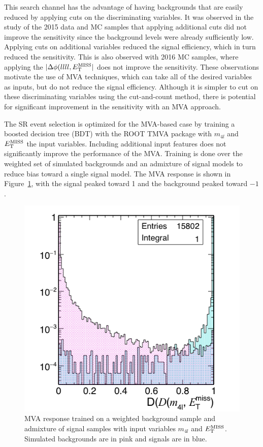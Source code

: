 This search channel has the advantage of having backgrounds that are easily reduced by applying cuts on the discriminating variables. It was observed in the study of the 2015 data and MC samples that applying additional cuts did not improve the sensitivity since the background levels were already sufficiently low. Applying cuts on additional variables reduced the signal efficiency, which in turn reduced the sensitivity. This is also observed with 2016 MC samples, where applying the $|\Delta\phi(llll, E_{\rm{T}}^{\rm{MISS}}|$ does not improve the sensitivity. These observations motivate the use of MVA techniques, which can take all of the desired variables as inputs, but do not reduce the signal efficiency. Although it is simpler to cut on these discriminating variables using the cut-and-count method, there is potential for significant improvement in the sensitivity with an MVA approach.

The SR event selection is optimized for the MVA-based case by training a boosted decision tree (BDT) with the ROOT TMVA package with $m_{4l}$ and $E_{\rm{T}}^{\rm{MISS}}$ the input variables. Including additional input features does not significantly improve the performance of the MVA. Training is done over the weighted set of simulated backgrounds and an admixture of signal models to reduce bias toward a single signal model. The MVA response is shown in Figure~\ref{fig:bdt}, with the signal peaked toward 1 and the background peaked toward $-1$. 

\begin{figure}[tbh]
\centering
\includegraphics[width=5in]{figures/f_Dm4lmet_1D_log.png}
\caption{MVA response trained on a weighted background sample and admixture of signal samples with input variables $m_{4l}$ and $E_{\rm{T}}^{\rm{MISS}}$. Simulated backgrounds are in pink and signals are in blue.}
\label{fig:bdt}
\end{figure}

